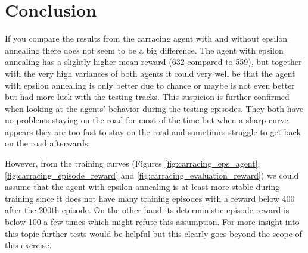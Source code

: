 \documentclass[a4paper,12pt]{article}
\begin{document}
\section{Conclusion}
If you compare the results from the carracing agent with and without epsilon annealing there does not seem to be a big difference. The agent with epsilon annealing has a slightly higher mean reward (632 compared to 559), but together with the very high variances of both agents it could very well be that the agent with epsilon annealing is only better due to chance or maybe is not even better but had more luck with the testing tracks. This suspicion is further confirmed when looking at the agents' behavior during the testing episodes. They both have no problems staying on the road for most of the time but when a sharp curve appears they are too fast to stay on the road and sometimes struggle to get back on the road afterwards. 

However, from the training curves (Figures \ref{fig:carracing_eps_agent}, \ref{fig:carracing_episode_reward} and \ref{fig:carracing_evaluation_reward}) we could assume that the agent with epsilon annealing is at least more stable during training since it does not have many training episodes with a reward below 400 after the 200th episode. On the other hand its deterministic episode reward is below 100 a few times which might refute this assumption. For more insight into this topic further tests would be helpful but this clearly goes beyond the scope of this exercise. 
\end{document}
